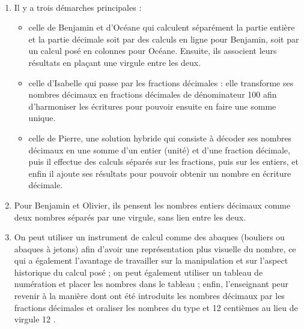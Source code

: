 \ \\ [-5mm]
\begin{enumerate}
   \item Il y a trois démarches principales :
   \begin{itemize}
      \item celle de Benjamin et d'Océane qui calculent séparément la partie entière et la partie décimale soit par des calculs en ligne pour Benjamin, soit par un calcul posé en colonnes pour Océane. Ensuite, ils associent leurs résultats en plaçant une virgule entre les deux.
      \item celle d'Isabelle qui passe par les fractions décimales : elle transforme ses nombres décimaux en fractions décimales de dénominateur 100 afin d'harmoniser les écritures pour pouvoir ensuite en faire une somme unique.
      \item celle de Pierre, une solution hybride qui consiste à décoder ses nombres décimaux en une somme d'un entier (unité) et d'une fraction décimale, puis il effectue des calculs séparés sur les fractions, puis sur les entiers, et enfin il ajoute ses résultats pour pouvoir obtenir un nombre en écriture décimale.
   \end{itemize}
   \item Pour Benjamin et Olivier, ils pensent les nombres entiers décimaux comme deux nombres séparés par une virgule, sans lien entre les deux.
   \item On peut utiliser un instrument de calcul comme des abaques (bouliers ou abaques à jetons) afin d'avoir une représentation plus visuelle du nombre, ce qui a également l'avantage de travailler sur la manipulation et sur l'aspect historique du calcul posé ; on peut également utiliser un tableau de numération et placer les nombres dans le tableau ; enfin, l'enseignant peur revenir à la manière dont ont été introduits les nombres décimaux par les fractions décimales et oraliser les nombres du type  et 12 centièmes \fg{} au lieu de  virgule 12 \fg{}.
\end{enumerate}
